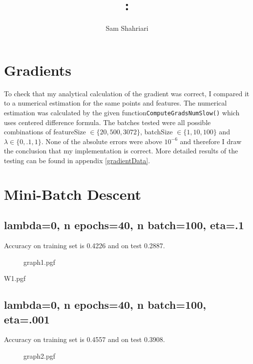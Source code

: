 \documentclass[12pt, a4paper]{article}
\author{Sam Shahriari}
\title{\course: \assignment}
\begin{document}
\maketitle
\section{Gradients}
To check that my analytical calculation of the gradient was correct, I compared it to a numerical estimation for the same points and features. The numerical estimation was calculated by the given function\texttt{ComputeGrads\-NumSlow()} which uses centered difference formula. The batches tested were all possible combinations of featureSize $\in \{20, 500, 3072\}$, batchSize $\in\{1, 10, 100\}$ and $\lambda \in \{0,.1,1\}$. None of the absolute errors were above $10^{-6}$ and therefore I draw the conclusion that my implementation is correct.
More detailed results of the testing can be found in appendix \ref{gradientData}.


\newpage
\section{Mini-Batch Descent}

\subsection{lambda=0, n epochs=40, n batch=100, eta=.1}
Accuracy on training set is 0.4226 and on test 0.2887.

\begin{figure}[H]

    {graph1.pgf}
\end{figure}

\begin{adjustbox}{clip,trim=0cm 4cm 3cm 5cm}

    {W1.pgf}
\end{adjustbox}


\newpage

\subsection{lambda=0, n epochs=40, n batch=100, eta=.001}
Accuracy on training set is 0.4557 and on test 0.3908.


\begin{figure}[h!]

    {graph2.pgf}
\end{figure}
\end{document}
